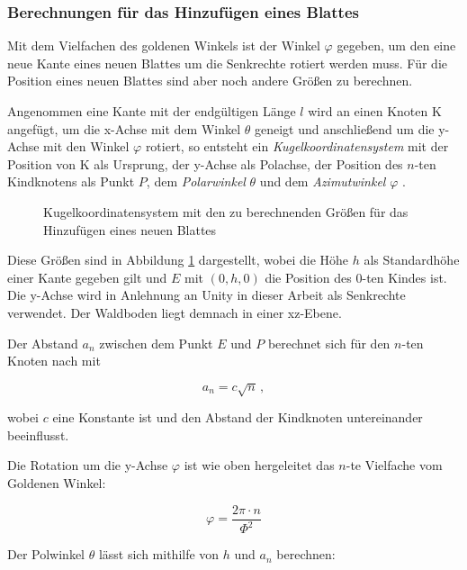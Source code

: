 \subsubsection*{Berechnungen für das Hinzufügen eines Blattes}
Mit dem Vielfachen des goldenen Winkels ist der Winkel $\varphi$ gegeben, um den eine neue Kante eines neuen Blattes um die Senkrechte rotiert werden muss. Für die Position eines neuen Blattes sind aber noch andere Größen zu berechnen.

Angenommen eine Kante mit der endgültigen Länge $l$ wird an einen Knoten K angefügt, um die x-Achse mit dem Winkel $\theta$ geneigt und anschließend um die y-Achse mit den Winkel $\varphi$ rotiert, so entsteht ein \textit{Kugelkoordinatensystem} mit der Position von K als Ursprung, der y-Achse als Polachse, der Position des $n$-ten Kindknotens als Punkt $P$, dem \emph{Polarwinkel} $\theta$ und dem \emph{Azimutwinkel} $\varphi$ \cite{papula2001mathematik}.

\begin{figure}[htb]
  
  \caption{Kugelkoordinatensystem mit den zu berechnenden Größen für das Hinzufügen eines neuen Blattes}
  \label{fig:spherical-coordinates}
\end{figure}

Diese Größen sind in Abbildung \ref{fig:spherical-coordinates} dargestellt, wobei die Höhe $h$ als Standardhöhe einer Kante gegeben gilt und $E$ mit $(0, h, 0)$ die Position des $0$-ten Kindes ist. Die y-Achse wird in Anlehnung an Unity in dieser Arbeit als Senkrechte verwendet. Der Waldboden liegt demnach in einer xz-Ebene.

Der Abstand $a_n$ zwischen dem Punkt $E$ und $P$ berechnet sich für den $n$-ten Knoten nach \cite{vogel1979better} mit

\begin{equation}
\label{eq:r}
  a_n = c \sqrt{n} \,,
\end{equation}

wobei $c$ eine Konstante ist und den Abstand der Kindknoten untereinander beeinflusst.

Die Rotation um die y-Achse $\varphi$ ist wie oben hergeleitet das $n$-te Vielfache vom Goldenen Winkel:

\begin{equation}
  \varphi = \frac{2\pi \cdot n}{\Phi^{2}}
\end{equation}

Der Polwinkel $\theta$ lässt sich mithilfe von $h$ und $a_n$ berechnen:

